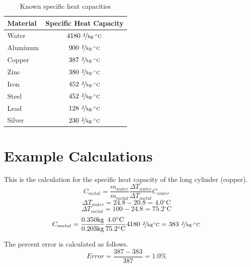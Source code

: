 \documentclass{article}
\begin{document}
\begin{table}[htbp]
\begin{center}
\footnotesize
\begin{tabular}{lc}
\toprule
 Material  & Specific Heat Capacity \\                                                      
\midrule
  
    Water   & $4180\  \nicefrac{ \text{J}}{\text{kg}\cdot {}^{\circ}\text{C}}$       \\
    Aluminum   & $900\   \nicefrac{ \text{J}}{\text{kg}\cdot {}^{\circ}\text{C}}$       \\
    Copper     & $387\   \nicefrac{ \text{J}}{\text{kg}\cdot {}^{\circ}\text{C}}$      \\
    Zinc     & $380\  \nicefrac{ \text{J}}{\text{kg}\cdot {}^{\circ}\text{C}}$      \\
     Iron     & $452\   \nicefrac{ \text{J}}{\text{kg}\cdot {}^{\circ}\text{C}}$      \\
     Steel     & $452\   \nicefrac{ \text{J}}{\text{kg}\cdot {}^{\circ}\text{C}}$      \\
     Lead     & $128\   \nicefrac{ \text{J}}{\text{kg}\cdot {}^{\circ}\text{C}}$      \\
     Silver     & $230\   \nicefrac{ \text{J}}{\text{kg}\cdot {}^{\circ}\text{C}}$      \\
    
\bottomrule
\end{tabular}
\end{center}
  \caption{Known specific heat capacities}
  \label{tab:font-sizes}
\end{table}

\newpage

\section{Example Calculations}
This is the calculation for the specific heat capacity of the long cylinder (copper).
$$C_{metal}=\frac{m_{water}}{m_{metal}}  \frac{\Delta T_{water}}{\Delta T_{metal}}    C_{water}$$
$$\Delta T_{water}=24.8-20.8=4.0 {}^{\circ}\text{C}$$
$$\Delta T_{metal}=100-24.8=75.2 {}^{\circ}\text{C}$$
$$C_{metal}=\frac{0.350 \text{kg}}{0.203 \text{kg}}  \frac{4.0  {}^{\circ}\text{C}}{75.2  {}^{\circ}\text{C}}    4180\  \nicefrac{ \text{J}}{\text{kg} {}^{\circ}\text{C}}=383\  \nicefrac{ \text{J}}{\text{kg}\cdot {}^{\circ}\text{C}}$$

The percent error is calculated as follows.
$$Error=\frac{387-383}{387}=1.0\%$$
\end{document}
